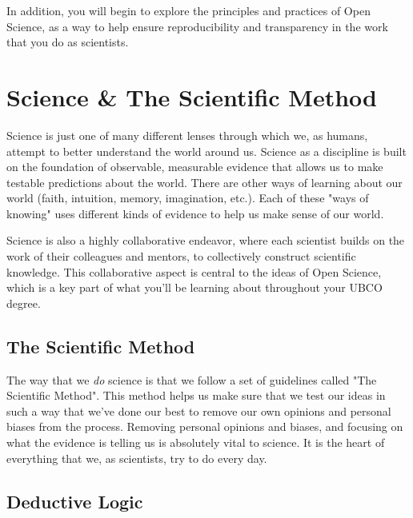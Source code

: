 \documentclass[
]{book}
\begin{document}
In addition, you will begin to explore the principles and practices of Open Science, as a way to help ensure reproducibility and transparency in the work that you do as scientists.

\hypertarget{science-the-scientific-method}{%
\chapter*{Science \& The Scientific Method}\label{science-the-scientific-method}}

Science is just one of many different lenses through which we, as humans, attempt to better understand the world around us. Science as a discipline is built on the foundation of observable, measurable evidence that allows us to make testable predictions about the world. There are other ways of learning about our world (faith, intuition, memory, imagination, etc.). Each of these "ways of knowing" uses different kinds of evidence to help us make sense of our world.

Science is also a highly collaborative endeavor, where each scientist builds on the work of their colleagues and mentors, to collectively construct scientific knowledge. This collaborative aspect is central to the ideas of Open Science, which is a key part of what you'll be learning about throughout your UBCO degree.

\hypertarget{the-scientific-method}{%
\section*{The Scientific Method}\label{the-scientific-method}}

The way that we \emph{do} science is that we follow a set of guidelines called "The Scientific Method". This method helps us make sure that we test our ideas in such a way that we've done our best to remove our own opinions and personal biases from the process. Removing personal opinions and biases, and focusing on what the evidence is telling us is absolutely vital to science. It is the heart of everything that we, as scientists, try to do every day.

\hypertarget{deductive-logic}{%
\section*{Deductive Logic}\label{deductive-logic}}
\end{document}
